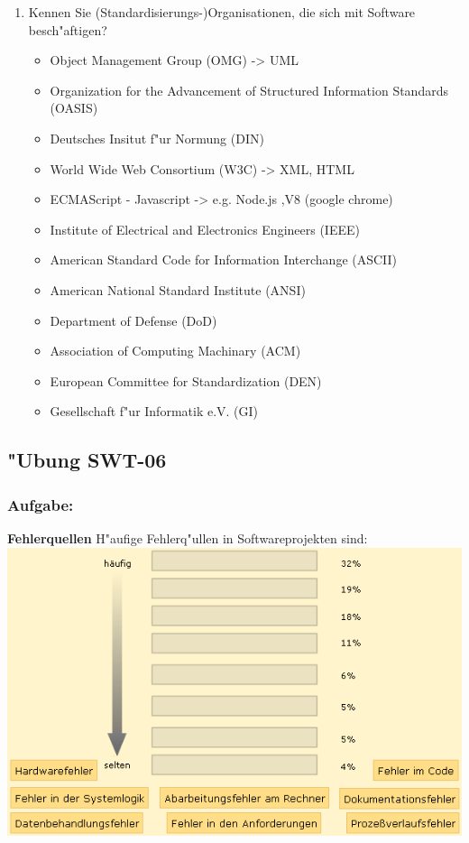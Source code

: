 \begin{enumerate}
\item Kennen Sie (Standardisierungs-)Organisationen, die sich mit Software besch"aftigen?


\begin{itemize}
  \item Object Management Group (OMG) -> UML
  \item Organization for the Advancement of Structured Information Standards (OASIS)
  \item Deutsches Insitut f"ur Normung (DIN)
  \item World Wide Web Consortium (W3C) -> XML, HTML
  \item ECMAScript - Javascript -> e.g. Node.js ,V8 (google chrome)
  \item Institute of Electrical and Electronics Engineers (IEEE)
  \item American Standard Code for Information Interchange (ASCII)
  \item American National Standard Institute (ANSI)
  \item Department of Defense (DoD)
  \item Association of Computing Machinary (ACM)
  \item European Committee for Standardization (DEN)
  \item Gesellschaft f"ur Informatik e.V. (GI)
\end{itemize}
\end{enumerate}

\newpage
\subsection{"Ubung SWT-06}
\subsubsection*{Aufgabe:}

\begin{framed}
\textbf{Fehlerquellen}
\smallbreak
H"aufige Fehlerq"ullen in Softwareprojekten sind:
\bigbreak
\includegraphics[width=1.0\textwidth]{./images/ueb01-06.png}
\end{framed}
\bigbreak
\bigbreak
